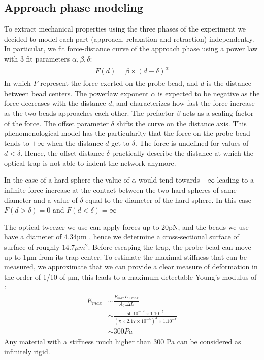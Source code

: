 \documentclass[A4paperpaper,11pt,english]{sphinxmanual}
\begin{document}
\subsection{Approach phase modeling}
\label{index-latex:approach-phase-modeling}
To extract mechanical properties using the three phases of the experiment we
decided to model each part (approach, relaxation and retraction) independently.
In particular, we fit force-distance curve of the approach phase using a power
law with 3 fit parameters \(\alpha, \beta, \delta\):
\label{index-latex:equation-eqa31}\begin{gather}
\begin{split}F(d) = \beta \times \left(d-\delta\right)^\alpha\end{split}\label{index-latex-eqa31}
\end{gather}
In which \(F\) represent the force exerted on the probe bead, and \(d\)
is the distance between bead centers. The powerlaw exponent \(\alpha\) is
expected to be negative as the force decreases with the distance \(d\), and
characterizes how fast the force increase as the two
beads approaches each other. The prefactor \(\beta\) acts as a scaling factor of the
force. The offset parameter \(\delta\) shifts the curve on the distance
axis. This phenomenological model has the particularity that the force on the probe bead tends to
\(+\infty\) when the distance \(d\) get  to \(\delta\). The force
is undefined for values of \(d< \delta\). Hence, the offset distance \(\delta\)
practically describe the distance at which the optical trap is not able to
indent the network anymore.

In the case of a hard sphere the value of \(\alpha\) would tend towards
\(-\infty\) leading to a infinite force increase at the contact between the
two hard-spheres of same diameter and a value of \(\delta\) equal to the
diameter of the hard sphere.  In this case \(F(d>\delta)=0\) and
\(F(d<\delta)=\infty\)

The optical tweezer we use can apply forces up to 20pN, and the beads we use
have a diameter of 4.34µm , hence we determine a cross-sectional surface of surface of roughly \(14.7\mu{}m^2\). Before
escaping the trap, the probe bead can move up to 1µm from its
trap center. To estimate the maximal stiffness that can be measured, we approximate that we can
provide a clear measure of deformation in the order of 1/10 of µm,  this
leads to a maximum detectable Young's modulus of :
\label{index-latex:equation-eqa32a}\begin{gather}
\begin{split}E_{max} &\sim \frac{F_{max}L_{0,max}}{A_0.\Delta L} \\
        &\sim \frac{50.10^{-12} \times 1.10^{-5} }{  (\pi\times 2.17\times 10^{-6})^2 \times 1.10^{-7}              }\\
        & \sim 300 Pa\end{split}\label{index-latex-eqa32a}
\end{gather}
Any material with a stiffness much higher than 300 Pa can be considered as
infinitely rigid.
\end{document}
